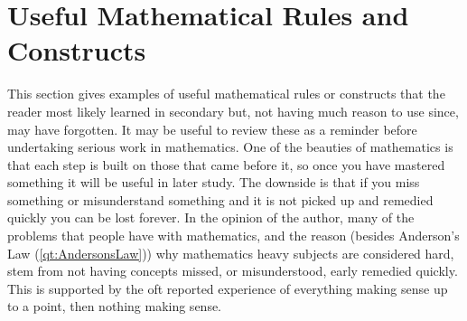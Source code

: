 \chapter{Useful Mathematical Rules and Constructs}

This section gives examples of useful mathematical rules or constructs that the reader most likely learned in secondary but, not having much reason to use since, may have forgotten.  It may be useful to review these as a reminder before undertaking serious work in mathematics.  One of the beauties of mathematics is that each step is built on those that came before it, so once you have mastered something it will be useful in later study.  The downside is that if you miss something or misunderstand something and it is not picked up and remedied quickly you can be lost forever.  In the opinion of the author, many of the problems that people have with mathematics, and the reason (besides Anderson's Law (\ref{qt:AndersonsLaw})) why mathematics heavy subjects are considered hard, stem from not having concepts missed, or misunderstood, early remedied quickly.  This is supported by the oft reported experience of everything making sense up to a point, then nothing making sense.